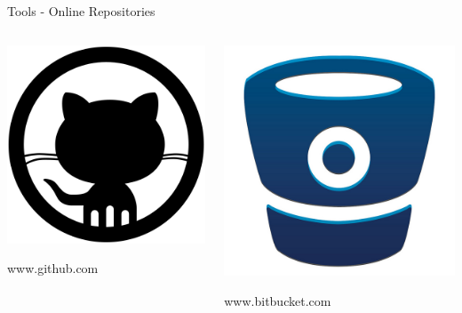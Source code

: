 \documentclass[table,svgnames,aspectratio=169]{beamer}
\begin{document}
\begin{frame}[label={sec:orgfcaecc0}]{Tools - Online Repositories}
\begin{columns}
\begin{column}{.33\columnwidth}
\begin{center}
\includegraphics[width=.9\linewidth]{graphics/github.png}
\end{center}
\begin{center}
www.github.com
\end{center}
\end{column}
\begin{column}{.33\columnwidth}
\begin{center}
\includegraphics[width=.9\linewidth]{graphics/bitbucket.jpg}
\end{center}
\begin{center}
www.bitbucket.com
\end{center}
\end{column}


\end{columns}
\end{frame}
\end{document}
